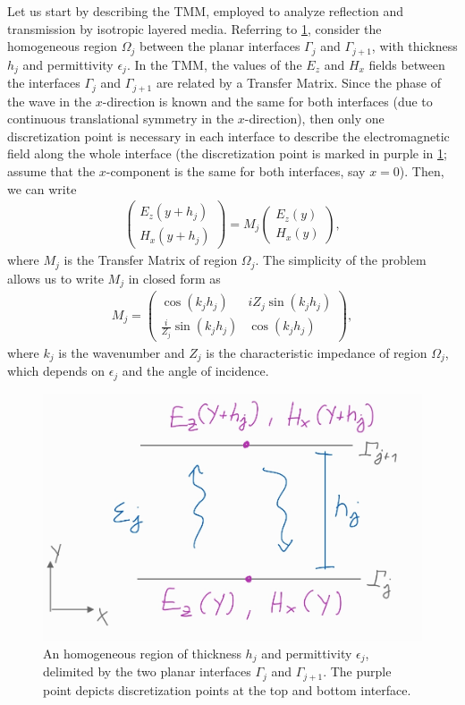 \documentclass[reprint,amsmath,amssymb,
 aps]{revtex4-2}
\begin{document}
 Let us start by describing the TMM, employed to analyze reflection and transmission by isotropic layered media. Referring to \cref{fig:t1}, consider the homogeneous region $\Omega_j$ between the planar interfaces $\Gamma_j$ and $\Gamma_{j+1}$, with thickness $h_j$ and permittivity $\epsilon_j$. In the TMM, the values of the $E_z$ and $H_x$ fields between the interfaces $\Gamma_j$ and $\Gamma_{j+1}$ are related by a Transfer Matrix. Since the phase of the wave in the $x$-direction is known and the same for both interfaces (due to continuous translational symmetry in the $x$-direction), then only one discretization point is necessary in each interface to describe the electromagnetic field along the whole interface (the discretization point is marked in purple in \cref{fig:t1}; assume that the $x$-component is the same for both interfaces, say $x=0$). Then, we can write
\begin{align}
\begin{pmatrix}
E_z(y+h_j) \\
H_x(y+h_j) 
\end{pmatrix} 
= M_j
\begin{pmatrix}
E_z(y) \\
H_x(y) 
\end{pmatrix},
\end{align}
where $M_j$ is the Transfer Matrix of region $\Omega_j$. The simplicity of the problem allows us to write $M_j$ in closed form as
\begin{align}
M_j = 
\begin{pmatrix}
\cos(k_jh_j) & iZ_j\sin(k_jh_j) \\
\frac{i}{Z_j}\sin(k_jh_j) & \cos(k_jh_j)
\end{pmatrix},
\end{align}
where $k_j$ is the wavenumber and $Z_j$ is the characteristic impedance of region $\Omega_j$, which depends on $\epsilon_j$ and the angle of incidence. 

\begin{figure}[h!]
\includegraphics[width=0.6\columnwidth]{figures/t1.jpg}
\caption{An homogeneous region of thickness $h_j$ and permittivity $\epsilon_j$, delimited by the two planar interfaces $\Gamma_j$ and $\Gamma_{j+1}$. The purple point depicts discretization points at the top and bottom interface.}
\label{fig:t1}
\end{figure}
\end{document}
